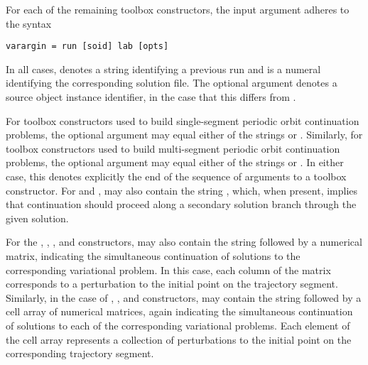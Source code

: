 For each of the remaining toolbox constructors, the  input argument adheres to the syntax
\begin{lstlisting}[language=coco-highlight]
varargin = run [soid] lab [opts]
\end{lstlisting}
In all cases,  denotes a string identifying a previous run and  is a numeral identifying the corresponding solution file. The optional argument  denotes a source object instance identifier, in the case that this differs from .

For toolbox constructors used to build single-segment periodic orbit continuation problems, the optional  argument may equal either of the strings  or . Similarly, for toolbox constructors used to build multi-segment periodic orbit continuation problems, the optional  argument may equal either of the strings  or . In either case, this denotes explicitly the end of the sequence of arguments to a  toolbox constructor. For  and ,  may also contain the string , which, when present, implies that continuation should proceed along a secondary solution branch through the given solution.

For the , , , and  constructors,  may also contain the string  followed by a numerical matrix, indicating the simultaneous continuation of solutions to the corresponding variational problem. In this case, each column of the matrix corresponds to a perturbation to the initial point on the trajectory segment. Similarly, in the case of , , and  constructors,  may contain the string  followed by a cell array of numerical matrices, again indicating the simultaneous continuation of solutions to each of the corresponding variational problems. Each element of the cell array represents a collection of perturbations to the initial point on the corresponding trajectory segment.


